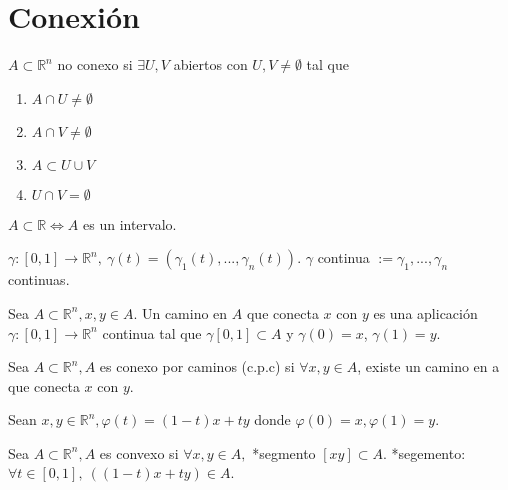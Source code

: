 \section{Conexión}

\begin{defn}
$A \subset \mathbb{R}^n$ no conexo si $\exists U,V$ abiertos con $U,V \neq \emptyset$ tal que
\begin{enumerate}[label=(\roman*)]
    \item $A \cap U \neq \emptyset $
    \item $A \cap V \neq \emptyset $
    \item $A \subset U\cup V$
    \item $U\cap V = \emptyset $
\end{enumerate}
\end{defn}

\begin{prop}
$A \subset \mathbb{R} \Leftrightarrow A$ es un intervalo.
\end{prop}

\begin{defn}
$\gamma:[0,1] \rightarrow \mathbb{R}^n, \ \gamma(t)=(\gamma_1(t),...,\gamma_n(t))$.
$\gamma$ continua $:= \gamma_1,...,\gamma_n$ continuas.
\end{defn}

\begin{defn}[Camino]
Sea $A \subset \mathbb{R}^n, x,y \in A$. Un camino en $A$ que conecta $x$ con $y$ es una aplicación $\gamma:[0,1] \rightarrow \mathbb{R}^n$ continua tal que $\gamma[0,1] \subset A$ y $\gamma(0) = x$, $\gamma(1) = y$. 
\end{defn}

\begin{defn}
Sea $A \subset \mathbb{R}^n, A$ es conexo por caminos (c.p.c) si $\forall x,y \in A$, existe un camino en a que conecta $x$ con $y$.
\end{defn}

\begin{ejm}
Sean $x,y\in\mathbb{R}^n, \varphi(t) = (1-t)x + ty$ donde $ \varphi(0) = x, \varphi(1) = y.$
\end{ejm}

\begin{defn}[Convexo]
Sea $A \subset \mathbb{R}^n, A$ es convexo si $ \forall x,y \in A,$ *segmento $[xy] \subset A$.
*segemento: $\forall t \in [0,1], \ ((1-t)x + ty) \in A$.
\end{defn}

